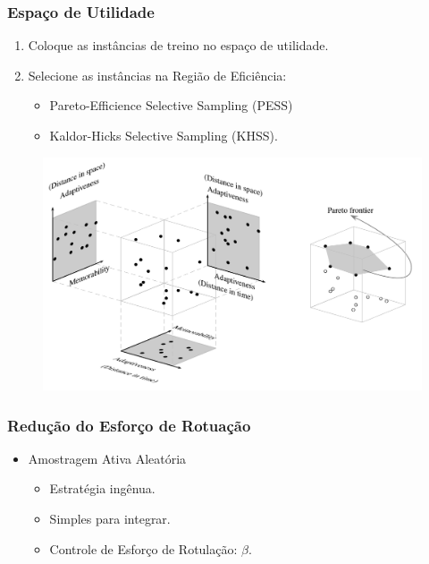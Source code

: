 \documentclass[14pt]{beamer}
\begin{document}
\begin{frame}\frametitle{Espaço de Utilidade}

\begin{enumerate}
\item Coloque as instâncias de treino no espaço de utilidade.
\item Selecione as instâncias na Região de Eficiência:
\begin{itemize}
\item Pareto-Efficience Selective Sampling (PESS)
\item Kaldor-Hicks Selective Sampling (KHSS).
\end{itemize}
\end{enumerate}

\vspace{-0.1in}
\begin{figure}
\centering
\includegraphics[scale=0.37]{pareto}
\end{figure}

\end{frame}

\begin{frame}\frametitle{Redução do Esforço de Rotuação}
\begin{itemize}
\item Amostragem Ativa Aleatória
\begin{itemize}
\item Estratégia ingênua.
\item Simples para integrar.
\item Controle de Esforço de Rotulação: $\beta$.
\end{itemize}
\end{itemize}
\end{frame}
\end{document}
